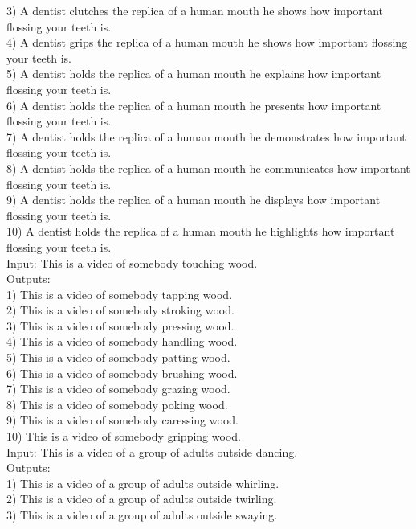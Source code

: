 {3) A dentist clutches the replica of a human mouth he shows how important flossing your teeth is. \\
4) A dentist grips the replica of a human mouth he shows how important flossing your teeth is. \\
5) A dentist holds the replica of a human mouth he explains how important flossing your teeth is. \\
6) A dentist holds the replica of a human mouth he presents how important flossing your teeth is. \\
7) A dentist holds the replica of a human mouth he demonstrates how important flossing your teeth is. \\
8) A dentist holds the replica of a human mouth he communicates how important flossing your teeth is.\\
9) A dentist holds the replica of a human mouth he displays how important flossing your teeth is. \\
10) A dentist holds the replica of a human mouth he highlights how important flossing your teeth is.\\
Input: This is a video of somebody touching wood. \\
Outputs:\\
1) This is a video of somebody tapping wood. \\
2) This is a video of somebody stroking wood. \\
3) This is a video of somebody pressing wood. \\
4) This is a video of somebody handling wood. \\
5) This is a video of somebody patting wood. \\
6) This is a video of somebody brushing wood. \\
7) This is a video of somebody grazing wood. \\
8) This is a video of somebody poking wood. \\
9) This is a video of somebody caressing wood. \\
10) This is a video of somebody gripping wood.\\
Input: This is a video of a group of adults outside dancing. \\
Outputs: \\
 1) This is a video of a group of adults outside whirling. \\
 2) This is a video of a group of adults outside twirling.\\
 3) This is a video of a group of adults outside swaying. \\
}
